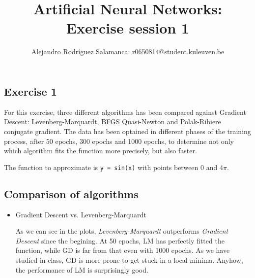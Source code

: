 \documentclass[10pt]{article}
\author{Alejandro Rodríguez Salamanca: r0650814@student.kuleuven.be}
\date{}
\title{Artificial Neural Networks: Exercise session 1}
\begin{document}
\maketitle
\begin{multicols}{2}

\section*{Exercise 1}

For this exercise, three different algorithms has been compared against Gradient Descent:
Levenberg-Marquardt, BFGS Quasi-Newton and Polak-Ribiere conjugate gradient.
The data has been optained in different phases of the training process, after 50 epochs,
300 epochs and 1000 epochs, to determine not only which algorithm fits the function more precisely, 
but also faster.

The function to approximate is \texttt{y = sin(x)} with points between 0 and 4$\pi$.

\subsection*{Comparison of algorithms}

\begin{itemize}
\item Gradient Descent vs. Levenberg-Marquardt

As we can see in the plots, \textit{Levenberg-Marquardt} outperforms \textit{Gradient Descent} since the begining.
At 50 epochs, LM has perfectly fitted the function, while GD is far from that even with 1000 epochs. As we have studied in class, GD is more prone to get stuck in a local minima. Anyhow, the performance of LM is surprisingly good.


\end{itemize}
\end{multicols}
\end{document}
